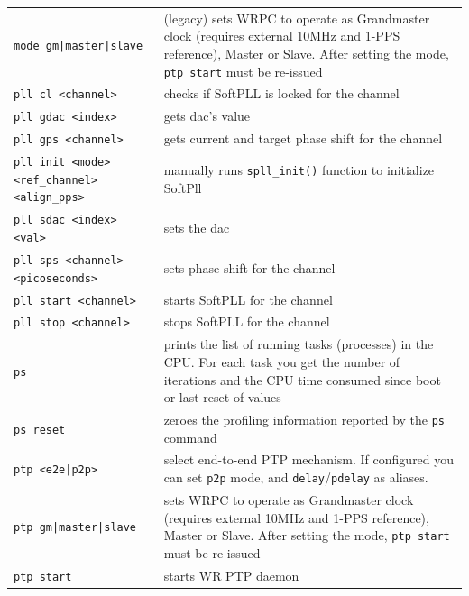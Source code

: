 \documentclass[a4paper, 12pt]{article}
\newcommand{\code}[1]{\texttt{#1}}
\begin{document}
\begin{longtable}{  p{7.5cm}  p{7cm} }
  \code{mode gm|master|slave} & (legacy) sets WRPC to operate as Grandmaster
    clock (requires external 10MHz and 1-PPS reference), Master or Slave.
    After setting the mode, \texttt{ptp start} must be re-issued \\

  \code{pll cl <channel>} & checks if SoftPLL is locked for the channel \\

  \code{pll gdac <index>} & gets dac's value \\

  \code{pll gps <channel>} & gets current and target phase shift for the
    channel \\

  \code{pll init <mode> <ref\_channel> <align\_pps>} & manually runs
    \texttt{spll\_init()} function to initialize SoftPll  \\

  \code{pll sdac <index> <val>} & sets the dac \\

  \code{pll sps <channel> <picoseconds>} & sets phase shift for the channel \\

  \code{pll start <channel>} & starts SoftPLL for the channel \\

  \code{pll stop <channel>} & stops SoftPLL for the channel \\

  \code{ps} & prints the list of running tasks (processes) in the CPU. For
    each task you get the number of iterations and the CPU time consumed since
    boot or last reset of values \\

  \code{ps reset} & zeroes the profiling information reported by the \code{ps}
    command \\

  \code{ptp <e2e|p2p>} & select end-to-end PTP mechanism. If configured you can
    set \texttt{p2p} mode, and \texttt{delay}/\texttt{pdelay} as aliases. \\

  \code{ptp gm|master|slave} & sets WRPC to operate as Grandmaster clock
    (requires external 10MHz and 1-PPS reference), Master or Slave. After
    setting the mode, \texttt{ptp start} must be re-issued \\

  \code{ptp start} & starts WR PTP daemon \\


\end{longtable}
\end{document}
